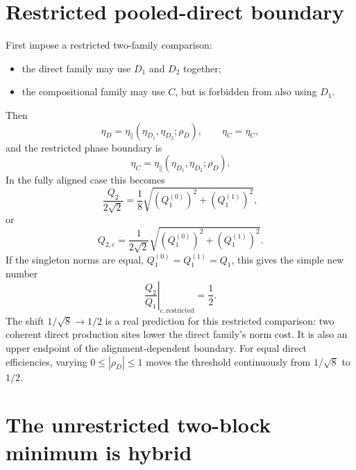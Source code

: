 \documentclass[11pt]{article}
\newcommand{\eone}{\eta_{D_1}}
\newcommand{\etwo}{\eta_{D_2}}
\newcommand{\ecomp}{\eta_C}
\begin{document}
\section{Restricted pooled-direct boundary}

First impose a restricted two-family comparison:
\begin{itemize}
    \item the direct family may use \(D_1\) and \(D_2\) together;
    \item the compositional family may use \(C\), but is forbidden from also using \(D_1\).
\end{itemize}
Then
\begin{equation}
\eta_D=\eta_{\parallel}(\eone,\etwo;\rho_D),
\qquad
\eta_C=\ecomp,
\end{equation}
and the restricted phase boundary is
\begin{equation}
\boxed{\ecomp=\eta_{\parallel}(\eone,\etwo;\rho_D).}
\label{eq:restricted-general}
\end{equation}
In the fully aligned case this becomes
\begin{equation}
\frac{Q_2}{2\sqrt2}
=\frac18\sqrt{\left(Q_1^{(0)}\right)^2+\left(Q_1^{(1)}\right)^2},
\end{equation}
or
\begin{equation}
\boxed{
Q_{2,c}=\frac{1}{2\sqrt2}
\sqrt{\left(Q_1^{(0)}\right)^2+\left(Q_1^{(1)}\right)^2}.}
\label{eq:restricted-boundary}
\end{equation}
If the singleton norms are equal, \(Q_1^{(0)}=Q_1^{(1)}=Q_1\), this gives the simple new
number
\begin{equation}
\boxed{\left.\frac{Q_2}{Q_1}\right|_{c,\mathrm{restricted}}=\frac12.}
\label{eq:half}
\end{equation}
The shift \(1/\sqrt8\to1/2\) is a real prediction for this restricted comparison: two coherent
direct production sites lower the direct family's norm cost.  It is also an upper endpoint of
the alignment-dependent boundary.  For equal direct efficiencies, varying
\(0\leq|\rho_D|\leq1\) moves the threshold continuously from \(1/\sqrt8\) to \(1/2\).

\section{The unrestricted two-block minimum is hybrid}
\end{document}
